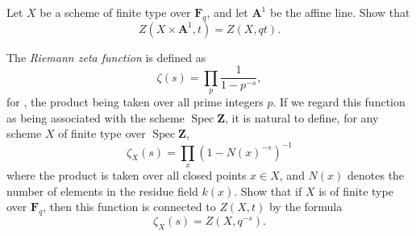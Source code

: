 {{\smallskip
\noindent\hypertarget{ex-C-5.3}{}Let $X$ be a scheme of finite type over $\mathbf F_q$, and let $\mathbf A^1$ be the affine line. Show that
\[
 Z(X\times\mathbf A^1,t)=Z(X,qt).
\]

\noindent\hypertarget{ex-C-5.4}{}The \emph{Riemann zeta function} is defined as
\[
 \zeta(s)=\prod_p\frac{1}{1-p^{-s}},
\]
\noindent for , the product being taken over all prime integers $p$. If we regard this function as being associated with the scheme $\operatorname{Spec}\mathbf Z$, it is natural to define, for any scheme $X$ of finite type over $\operatorname{Spec}\mathbf Z$,
\[
 \zeta_X(s)=\prod_x(1-N(x)^{-s})^{-1}
\]
\noindent where the product is taken over all closed points $x\in X$, and $N(x)$ denotes the number of elements in the residue field $k(x)$. Show that if $X$ is of finite type over $\mathbf F_q$, then this function is connected to $Z(X,t)$ by the formula
\[
 \zeta_X(s)=Z(X,q^{-s}).
\]
\par}
}
